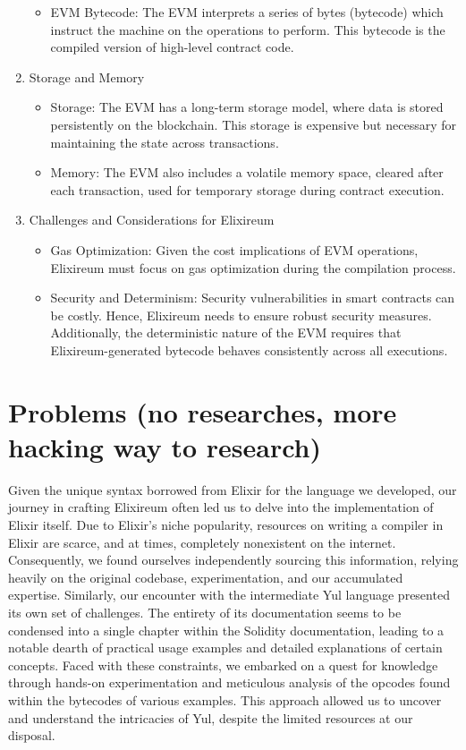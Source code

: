 \begin{enumerate}
\begin{itemize}
              \item           EVM Bytecode: The EVM interprets a series of bytes (bytecode) which instruct the machine on the operations to perform. This bytecode is the compiled version of high-level contract code.
          \end{itemize}
    \item Storage and Memory
          \begin{itemize}
              \item   Storage: The EVM has a long-term storage model, where data is stored persistently on the blockchain. This storage is expensive but necessary for maintaining the state across transactions.
              \item         Memory: The EVM also includes a volatile memory space, cleared after each transaction, used for temporary storage during contract execution.
          \end{itemize}
    \item Challenges and Considerations for Elixireum
          \begin{itemize}
              \item Gas Optimization: Given the cost implications of EVM operations, Elixireum must focus on gas optimization during the compilation process.
              \item Security and Determinism: Security vulnerabilities in smart contracts can be costly. Hence, Elixireum needs to ensure robust security measures. Additionally, the deterministic nature of the EVM requires that Elixireum-generated bytecode behaves consistently across all executions.
          \end{itemize}



\end{enumerate}




\section{Problems (no researches, more hacking way to research)}
\label{}

Given the unique syntax borrowed from Elixir for the language we developed, our journey in crafting Elixireum often led us to delve into the implementation of Elixir itself. Due to Elixir's niche popularity, resources on writing a compiler in Elixir are scarce, and at times, completely nonexistent on the internet. Consequently, we found ourselves independently sourcing this information, relying heavily on the original codebase, experimentation, and our accumulated expertise. 
Similarly, our encounter with the intermediate Yul language presented its own set of challenges. The entirety of its documentation seems to be condensed into a single chapter within the Solidity documentation, leading to a notable dearth of practical usage examples and detailed explanations of certain concepts. Faced with these constraints, we embarked on a quest for knowledge through hands-on experimentation and meticulous analysis of the opcodes found within the bytecodes of various examples. This approach allowed us to uncover and understand the intricacies of Yul, despite the limited resources at our disposal.
